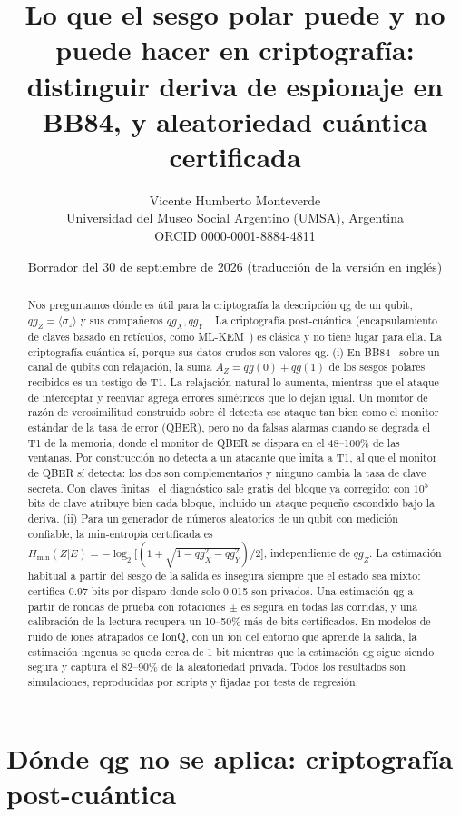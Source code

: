 \documentclass[11pt]{article}
\title{Lo que el sesgo polar puede y no puede hacer en criptografía:\\
distinguir deriva de espionaje en BB84, y aleatoriedad cuántica certificada}
\author{Vicente Humberto Monteverde\\
\small Universidad del Museo Social Argentino (UMSA), Argentina\\
\small ORCID 0000-0001-8884-4811}
\date{\small Borrador del 30 de septiembre de 2026 (traducción de la versión en inglés)}
\newcommand{\qgZ}{qg_Z}
\newcommand{\qgX}{qg_X}
\newcommand{\qgY}{qg_Y}
\begin{document}
\maketitle

\begin{abstract}
Nos preguntamos dónde es útil para la criptografía la descripción qg de un qubit, $\qgZ=\langle\sigma_z\rangle$
y sus compañeros $\qgX,\qgY$~\cite{monteverde2026qang}. La criptografía post-cuántica (encapsulamiento de
claves basado en retículos, como ML-KEM~\cite{fips203}) es clásica y no tiene lugar para ella. La
criptografía cuántica sí, porque sus datos crudos son valores qg. (i) En BB84~\cite{bennett1984} sobre un
canal de qubits con relajación, la suma $A_Z=qg(0)+qg(1)$ de los sesgos polares recibidos es un testigo de
T1. La relajación natural lo aumenta, mientras que el ataque de interceptar y reenviar agrega errores
simétricos que lo dejan igual. Un monitor de razón de verosimilitud construido sobre él detecta ese ataque
tan bien como el monitor estándar de la tasa de error (QBER), pero no da falsas alarmas cuando se degrada
el T1 de la memoria, donde el monitor de QBER se dispara en el 48--100\% de las ventanas. Por
construcción no detecta a un atacante que imita a T1, al que el monitor de QBER sí detecta: los dos son
complementarios y ninguno cambia la tasa de clave secreta. Con claves finitas~\cite{tomamichel2012} el
diagnóstico sale gratis del bloque ya corregido: con $10^5$ bits de clave atribuye bien cada bloque,
incluido un ataque pequeño escondido bajo la deriva. (ii) Para un generador de números aleatorios de un
qubit con medición confiable, la min-entropía certificada es
$H_{\min}(Z|E)=-\log_2\big[(1+\sqrt{1-\qgX^2-\qgY^2})/2\big]$, independiente de $\qgZ$. La estimación
habitual a partir del sesgo de la salida es insegura siempre que el estado sea mixto: certifica 0.97 bits
por disparo donde solo 0.015 son privados. Una estimación qg a partir de rondas de prueba con rotaciones
$\pm$ es segura en todas las corridas, y una calibración de la lectura recupera un 10--50\% más de bits
certificados. En modelos de ruido de iones atrapados de IonQ, con un ion del entorno que aprende la
salida, la estimación ingenua se queda cerca de 1 bit mientras que la estimación qg sigue siendo segura y
captura el 82--90\% de la aleatoriedad privada. Todos los resultados son simulaciones, reproducidas por
scripts y fijadas por tests de regresión.
\end{abstract}

\section{Dónde qg no se aplica: criptografía post-cuántica}
\end{document}
